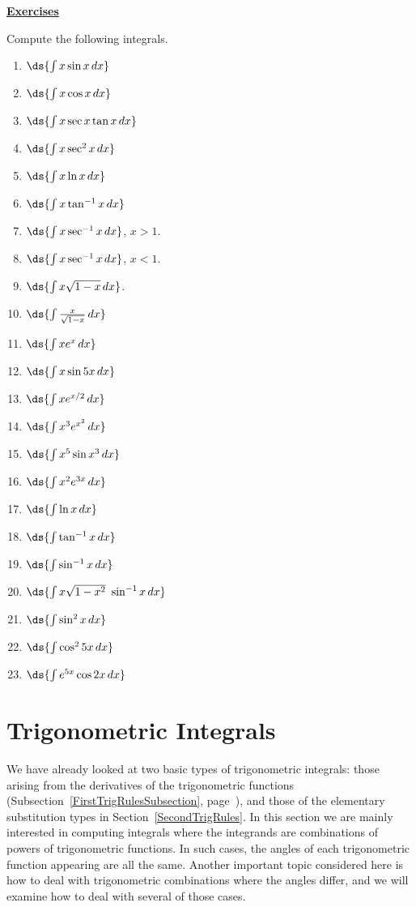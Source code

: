 \newpage
\begin{center}
\underline{\Large{\bf Exercises}}\end{center}

\begin{multicols}{2}

Compute the following integrals.
\begin{enumerate}
\item $\ds{\int x\sin x\,dx}$
\item $\ds{\int x\cos x\,dx}$
\item $\ds{\int x\sec x\tan x\,dx}$
\item $\ds{\int x\sec^2x\,dx}$
\item $\ds{\int x\ln x\,dx}$
\item $\ds{\int x\tan^{-1}x\,dx}$
\item $\ds{\int x\sec^{-1}x\,dx}$, $x>1$.
\item $\ds{\int x\sec^{-1}x\,dx}$, $x<1$.
\item $\ds{\int x\sqrt{1-x}\,dx}$.
\item $\ds{\int\frac{x}{\sqrt{1-x}}\,dx}$
\item $\ds{\int xe^x\,dx}$
\item $\ds{\int x\sin5x\,dx}$
\item $\ds{\int x e^{x/2}\,dx}$
\item $\ds{\int x^3e^{x^2}\,dx}$
\item $\ds{\int x^5\sin x^3\,dx}$
\item $\ds{\int x^2e^{3x}\,dx}$
\item $\ds{\int \ln x\,dx}$
\item $\ds{\int \tan^{-1}x\,dx}$
\item $\ds{\int\sin^{-1}x\,dx}$
\item $\ds{\int x\sqrt{1-x^2}\ \sin^{-1}x\,dx}$
\item $\ds{\int\sin^2x\,dx}$
\item $\ds{\int\cos^25x\,dx}$
\item $\ds{\int e^{5x}\cos2x\,dx}$
\end{enumerate}
\end{multicols}
\newpage
\section{Trigonometric Integrals\label{TrigIntsSection}}
We have already looked at two basic types of trigonometric
integrals:  those arising from the derivatives of the
trigonometric functions (Subsection~\ref{FirstTrigRulesSubsection}, 
page~\pageref{FirstTrigRulesSubsection}), and those of the elementary
substitution types in Section~\ref{SecondTrigRules}.
In this section we are mainly interested in
computing integrals
where the integrands are combinations of powers of
trigonometric functions.  In such cases, the 
angles of each trigonometric function appearing are all the same.
Another important topic considered here is how to deal
with trigonometric combinations where the angles differ,
and we will examine how to deal with several of those cases.

